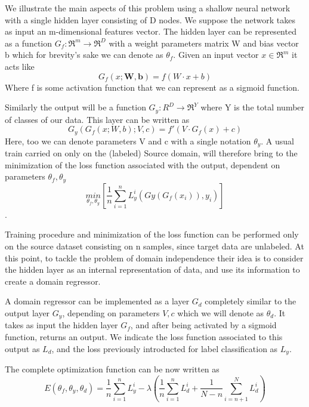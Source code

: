\documentclass[11pt]{report}
\begin{document}
We illustrate the main aspects of this problem using a shallow neural network with a single hidden layer consisting of D nodes.
We suppose the network takes as input an m-dimensional features vector.
The hidden layer can be represented as a function $G_f : \Re^m \rightarrow \Re^D$ with a weight parameters matrix W and bias vector b which for brevity's sake we can denote as $\theta_f$.
Given an input vector $x \in \Re^m$ it acts like
\begin{equation}
G_f(x; \mathbf{W}, \mathbf{b}) = f(W\cdot x + b)
\end{equation}
Where f is some activation function that we can represent as a sigmoid function.

Similarly the output will be a function $G_y:R^D \rightarrow \Re^Y$ where Y is the total number of classes of our data. This layer can be written as
\begin{equation}
G_y(G_f(x; W, b); V, c) = f'(V\cdot G_f(x) + c)
\end{equation}
Here, too we can denote parameters V and c with a single notation $\theta_y$.
A usual train carried on only on the (labeled) Source domain, will therefore bring to the minimization of the loss function associated with the output, dependent on parameters $\theta_f, \theta_y$
\begin{equation}
\underset{\theta_f, \theta_y}{min} [ \frac{1}{n}\sum_{i = 1}^n L_y^i(Gy(G_f(x_i)), y_i )]
\end{equation}.

Training procedure and minimization of the loss function can be performed only on the source dataset consisting on n samples, since target data are unlabeled.
At this point, to tackle the problem of domain independence their idea is to consider the hidden layer as an internal representation of data, and use its information to create a domain regressor.

A domain regressor can be implemented as a layer $G_d$ completely similar to the output layer $G_y$, depending on parameters $V, c$ which we will denote as $\theta_d$. It takes as input the hidden layer $G_f$, and after being activated by a sigmoid function, returns an output.
We indicate the loss function associated to this output as $L_d$, and the loss previously introducted for label classification as $L_y$.

The complete optimization function can be now written as
\begin{equation}
E(\theta_f, \theta_y, \theta_d) = \frac{1}{n} \sum_{i = 1}^n L_y^i - \lambda (\frac{1}{n} \sum_{i = 1}^n L_d^i + \frac{1}{N-n} \sum_{i = n+1}^N L_d^i)
\end{equation}
\end{document}
